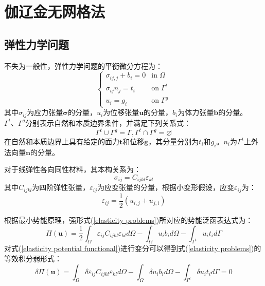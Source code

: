 \section{伽辽金无网格法}
\subsection{弹性力学问题}
不失为一般性，弹性力学问题的平衡微分方程为：
\begin{equation}\label{elasticity problems}
\begin{cases}
    \sigma_{ij,j}+b_i=0&\text{in}\;\Omega\\
    \sigma_{ij}n_j=t_i&\text{on}\;\Gamma^t\\
    u_i=g_i&\text{on}\;\Gamma^g
\end{cases}
\end{equation}
其中$\sigma_{ij}$为应力张量$\pmb \sigma$的分量，$u_i$为位移张量$\pmb{u}$的分量，$b_i$为体力张量$\pmb{b}$的分量。$\Gamma^t \text{、}\Gamma^g$分别表示自然和本质边界条件，并满足下列关系式：
\begin{equation}\label{EGeometric relationships}
\Gamma^t\cup \Gamma^g=\Gamma,\Gamma^t\cap \Gamma^g=\varnothing
\end{equation}
在自然和本质边界上具有给定的面力$\pmb{t}$和位移$\pmb{g}$，其分量分别为$t_i$和$g_i$。$n_i$为$\Gamma^{t}$上外法向量$\pmb{n}$的分量。\par
对于线弹性各向同性材料，其本构关系为：
\begin{equation}\label{constitutive relation}
    \sigma_{ij}=C_{ijkl}\varepsilon_{kl}
\end{equation}
其中$C_{ijkl}$为四阶弹性张量，$\varepsilon_{ij}$为应变张量的分量，根据小变形假设，应变$\varepsilon_{ij}$为：
\begin{equation}\label{CH2-strain}
    \varepsilon_{ij}=\frac{1}{2}(u_{i,j}+u_{j,i})
\end{equation} \par
根据最小势能原理，强形式(\ref{elasticity problems})所对应的势能泛函表达式为：
\begin{equation}\label{elasticity potential functional}
    \Pi(\pmb{u})=\frac{1}{2}\int_{\Omega}\varepsilon_{ij}C_{ijkl}\varepsilon_{kl}d\Omega-\int_{\Omega}u_ib_id\Omega-\int_{\Gamma^t}u_it_id\Gamma
\end{equation}
对式(\ref{elasticity potential functional})进行变分可以得到式(\ref{elasticity problems})的等效积分弱形式：
\begin{equation}\label{elasticity weak form}
    \delta\Pi(\pmb{u})=\int_{\Omega}\delta\varepsilon_{ij}C_{ijkl}\varepsilon_{kl}d\Omega-\int_{\Omega}\delta u_ib_id\Omega-\int_{\Gamma^t}\delta u_it_id\Gamma=0
\end{equation}\par
